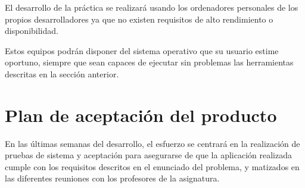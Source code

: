 El desarrollo de la práctica se realizará usando los ordenadores personales de
los propios desarrolladores ya que no existen requisitos de alto rendimiento o
disponibilidad.

Estos equipos podrán disponer del sistema operativo que su usuario estime
oportuno, siempre que sean capaces de ejecutar sin problemas las herramientas
descritas en la sección anterior.

\section{Plan de aceptación del producto}

En las últimas semanas del desarrollo, el esfuerzo se centrará en la
realización de pruebas de sistema y aceptación para asegurarse de que la
aplicación realizada cumple con los requisitos descritos en el enunciado del
problema, y matizados en las diferentes reuniones con los profesores de la
asignatura.
